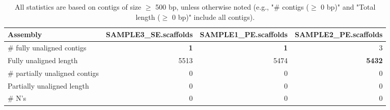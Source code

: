 \documentclass[12pt,a4paper]{article}
\begin{document}
\begin{table}[ht]
\begin{center}
\caption{All statistics are based on contigs of size $\geq$ 500 bp, unless otherwise noted (e.g., "\# contigs ($\geq$ 0 bp)" and "Total length ($\geq$ 0 bp)" include all contigs).}
\begin{tabular}{|l*{3}{|r}|}
\hline
Assembly & SAMPLE3\_SE.scaffolds & SAMPLE1\_PE.scaffolds & SAMPLE2\_PE.scaffolds \\ \hline
\# fully unaligned contigs & {\bf 1} & {\bf 1} & 3 \\ \hline
Fully unaligned length & 5513 & 5474 & {\bf 5432} \\ \hline
\# partially unaligned contigs & 0 & 0 & 0 \\ \hline
Partially unaligned length & 0 & 0 & 0 \\ \hline
\# N's & 0 & 0 & 0 \\ \hline
\end{tabular}
\end{center}
\end{table}
\end{document}
